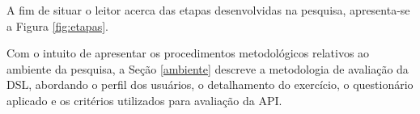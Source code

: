     
    
    \newpage
    A fim de situar o leitor acerca das etapas desenvolvidas na pesquisa, apresenta-se a Figura \ref{fig:etapas}.
    
    
    
    
    Com o intuito de apresentar os procedimentos metodológicos relativos ao ambiente da pesquisa, a Seção \ref{ambiente} descreve a metodologia de avaliação da DSL, abordando o perfil dos usuários, o detalhamento do exercício, o questionário aplicado e os critérios utilizados para avaliação da \gls{API}. 
    
    
    
  